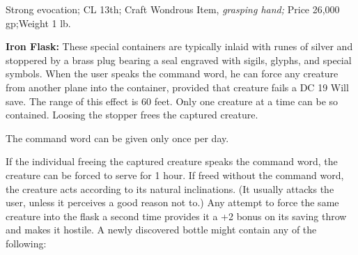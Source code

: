 Strong evocation; CL 13th; Craft Wondrous Item, \textit{grasping hand; }Price 26,000 
gp;Weight 1 lb.

\textbf{Iron Flask:} These special containers are typically inlaid with runes of 
silver and stoppered by a brass plug bearing a seal engraved with sigils, glyphs, 
and special symbols. When the user speaks the command word, he can force any creature 
from another plane into the container, provided that creature fails a DC 19 Will 
save. The range of this effect is 60 feet. Only one creature at a time can be so 
contained. Loosing the stopper frees the captured creature. 

The command word can be given only once per day.

If the individual freeing the captured creature speaks the command word, the creature 
can be forced to serve for 1 hour. If freed without the command word, the creature 
acts according to its natural inclinations. (It usually attacks the user, unless 
it perceives a good reason not to.) Any attempt to force the same creature into 
the flask a second time provides it a +2 bonus on its saving throw and makes it 
hostile. A newly discovered bottle might contain any of the following:

